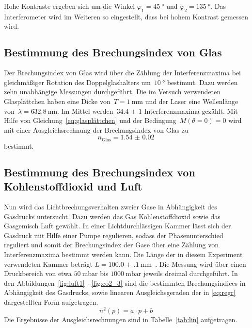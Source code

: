 Hohe Kontraste ergeben sich um die Winkel $\varphi_1=\SI{45}{\degree}$ und
$\varphi_2=\SI{135}{\degree}$. Das Interferometer wird im Weiteren so
eingestellt, dass bei hohem Kontrast gemessen wird.

\subsection{Bestimmung des Brechungsindex von Glas}
Der Brechungsindex von Glas wird über die Zählung der Interferenzmaxima bei
gleichmäßiger Rotation des Doppelglashalters um~$\SI{10}{\degree}$ bestimmt.
Dazu werden zehn unabhängige Messungen durchgeführt. Die im Versuch verwendeten
Glasplättchen haben eine Dicke von~$T=\SI{1}{\milli\meter}$ und der Laser eine
Wellenlänge von~$\lambda=\SI{632.8}{\nano\meter}$. Im Mittel
werden~$\num{34.4(10)}$ Interferenzmaxima gezählt. Mit Hilfe von
Gleichung~\eqref{eq:glasplättchen} und der Bedingung~$M(\theta=0)=0$ wird mit
einer Ausgleichsrechnung der Brechungsindex von Glas zu
\begin{equation}
  n_{\text{Glas}}=\num{1.54(2)}
  \label{eq:glas}
\end{equation}
bestimmt.

\subsection{Bestimmung des Brechungsindex von Kohlenstoffdioxid und Luft}
%
Nun wird das Lichtbrechungsverhalten zweier Gase in Abhängigkeit des Gasdrucks
untersucht. Dazu werden das Gas Kohlenstoffdioxid sowie das Gasgemisch Luft
gewählt. In einer Lichtdurchlässigen Kammer lässt sich der Gasdruck mit Hilfe
einer Pumpe regulieren, sodass der Phasenunterschied reguliert und somit der
Brechungsindex der Gase über eine Zählung von Interferenzmaxima bestimmt werden
kann. Die Länge der in diesem Experiment verwendeten Kammer beträgt
$L=\SI{100.0(1)}{\milli\meter}$~\cite{V64}. Die Messung wird über einen
Druckbereich von etwa $\SI{50}{\milli\bar}$ bis $\SI{1000}{\milli\bar}$ jeweils
dreimal durchgeführt. In den Abbildungen~\ref{fig:luft1} - \ref{fig:co2_3} sind die bestimmten
Brechungsindices in Abhängigkeit des Gasdrucks, sowie linearen Ausgleichsgeraden der in \eqref{eq:regr} dargestellten Form aufgetragen.
%
\begin{equation}
  n^2(p)=a\cdot p + b
  \label{eq:regr}
\end{equation}
%
Die Ergebnisse der Ausgleichsrechnungen sind in Tabelle~\ref{tab:lin} aufgetragen.

